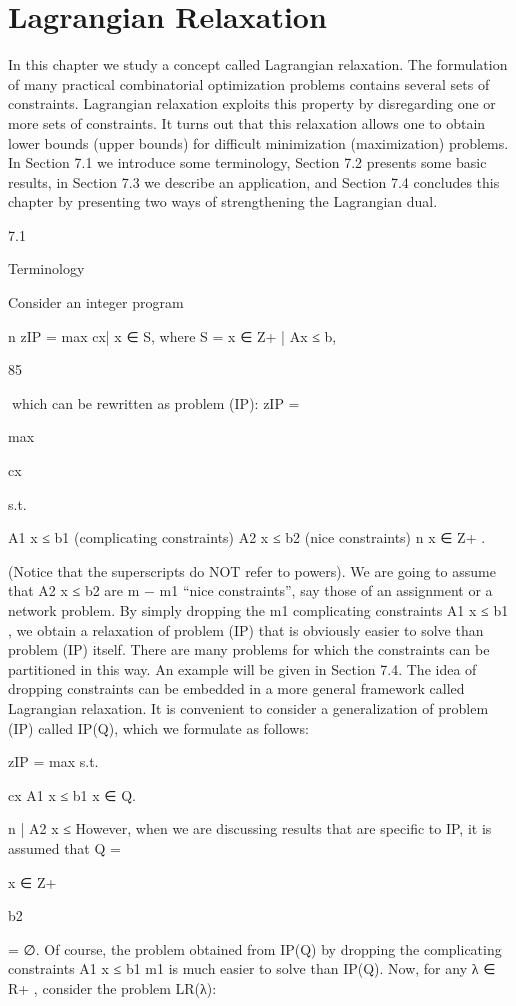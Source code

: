 \chapter{Lagrangian Relaxation}
In this chapter we study a concept called Lagrangian relaxation. The formulation of many practical
combinatorial optimization problems contains several sets of constraints. Lagrangian relaxation exploits
this property by disregarding one or more sets of constraints. It turns out that this relaxation allows
one to obtain lower bounds (upper bounds) for difficult minimization (maximization) problems. In
Section 7.1 we introduce some terminology, Section 7.2 presents some basic results, in Section 7.3 we
describe an application, and Section 7.4 concludes this chapter by presenting two ways of strengthening
the Lagrangian dual.

7.1

Terminology

Consider an integer program

n
zIP = max {cx| x ∈ S}, where S = {x ∈ Z+
| Ax ≤ b},

85

which can be rewritten as problem (IP):
zIP =

max

cx

s.t.

A1 x ≤ b1 (complicating constraints)
A2 x ≤ b2 (nice constraints)
n
x ∈ Z+
.

(Notice that the superscripts do NOT refer to powers). We are going to assume that A2 x ≤ b2 are
m − m1 “nice constraints”, say those of an assignment or a network problem. By simply dropping the
m1 complicating constraints A1 x ≤ b1 , we obtain a relaxation of problem (IP) that is obviously easier to
solve than problem (IP) itself. There are many problems for which the constraints can be partitioned in
this way. An example will be given in Section 7.4.
The idea of dropping constraints can be embedded in a more general framework called Lagrangian relaxation. It is convenient to consider a generalization of problem (IP) called IP(Q), which we formulate as
follows:

zIP = max
s.t.

cx
A1 x ≤ b1
x ∈ Q.

n
| A2 x ≤
However, when we are discussing results that are specific to IP, it is assumed that Q = {x ∈ Z+

b2 } = ∅. Of course, the problem obtained from IP(Q) by dropping the complicating constraints A1 x ≤ b1
m1
is much easier to solve than IP(Q). Now, for any λ ∈ R+
, consider the problem LR(λ):


